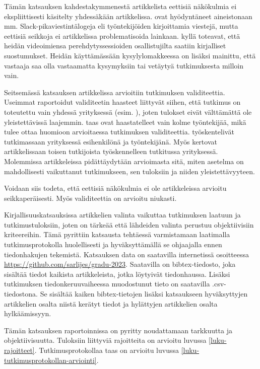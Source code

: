 \documentclass[utf8]{gradu3}
\begin{document}
Tämän katsauksen kahdestakymmenestä artikkelista eettisiä näkökulmia ei ekspliittisesti käsitelty yhdessäkään artikkelissa. \textcite{moe-ym-2020} ovat hyödyntäneet aineistonaan mm. Slack-pikaviestintälogeja eli työntekijöiden kirjoittamia viestejä, mutta eettisiä seikkoja ei artikkelissa problematisoida lainkaan. \textcite{yates-ym-2020} kyllä toteavat, että heidän videoimiensa perehdytyssessioiden osallistujilta saatiin kirjalliset suostumukset. Heidän käyttämässään kysylylomakkeessa on lisäksi mainittu, että vastaaja saa olla vastaamatta kysymyksiin tai vetäytyä tutkimuksesta milloin vain. 

Seitsemässä katsauksen artikkelissa arvioitiin tutkimuksen validiteettia. Useimmat raportoidut validiteetin haasteet liittyvät siihen, että tutkimus on toteutettu vain yhdessä yrityksessä (esim. \textcite{johnson-senges-2010}), joten tulokset eivät välttämättä ole yleistettävissä laajemmin. \textcite{viana-ym-2014} taas ovat haastatelleet vain kolme työntekijää, mikä tulee ottaa huomioon arvioitaessa tutkimuksen validiteettia. \textcite{hemphill-begel-2011} työskentelivät tutkimassaan yrityksessä esihenkilönä ja työntekijänä. Myös \textcite{kumar-wallace-2019} kertovat artikkelissaan toisen tutkijoista työskennelleen tutkitussa yrityksessä. Molemmissa artikkeleissa pidättäydytään arvioimasta sitä, miten asetelma on mahdollisesti vaikuttanut tutkimukseen, sen tuloksiin ja niiden yleistettävyyteen.

Voidaan siis todeta, että eettisiä näkökulmia ei ole artikkeleissa arvioitu seikkaperäisesti. Myös validiteettia on arvioitu niukasti.

Kirjallisuuskatsauksissa artikkelien valinta vaikuttaa tutkimuksen laatuun ja tutkimustuloksiin, joten on tärkeää että lähdeiden valinta perustuu objektiivisiin kriteereihin. Tämä pyrittiin katsausta tehtäessä varmistamaan laatimalla tutkimusprotokolla huolellisesti ja hyväksyttämällä se ohjaajalla ennen tiedonhakujen tekemistä. Katsauksen data on saatavilla internetissä osoitteessa 
 \href{https://github.com/sarlijes/gradu-2023}{https://github.com/sarlijes/gradu-2023}. Saatavilla on bibtex-tiedosto, joka sisältää tiedot kaikista artikkeleista, jotka löytyivät tiedonhaussa. Lisäksi tutkimuksen tiedonkeruuvaiheessa muodostunut tieto on saatavilla .csv-tiedostona. Se sisältää kaiken bibtex-tietojen lisäksi katsaukseen hyväksyttyjen artikkelien osalta niistä kerätyt tiedot ja hylättyjen artikkelien osalta hylkäämissyyn. 

Tämän katsauksen raportoinnissa on pyritty noudattamaan tarkkuutta ja objektiivisuutta. Tuloksiin liittyviä rajoitteita on arvioitu luvussa \ref{luku-rajoitteet}. Tutkimusprotokollaa taas on arvioitu luvussa \ref{luku-tutkimusprotokollan-arviointi}.


\printbibliography
\end{document}
